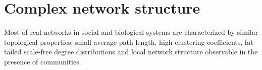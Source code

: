 \documentclass[times, utf8, diplomski]{fer}
\begin{document}
%
%
%
%
%

\chapter{Complex network structure}
\label{structure}
Most of real networks in social and biological systems are characterized by  similar topological properties: small average path length, high clustering coefficients, fat tailed scale-free degree distributions and  local network structure observable in the presence of communities.
\end{document}
